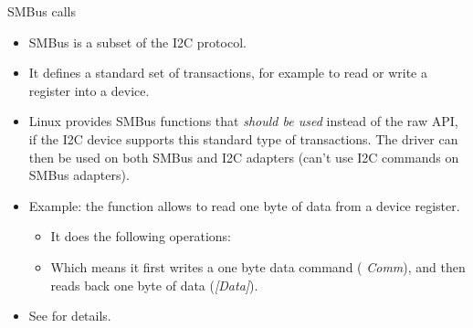 \begin{frame}{SMBus calls}
  \begin{itemize}
  \item SMBus is a subset of the I2C protocol.
  \item It defines a standard set of transactions, for example to read
    or write a register into a device.
  \item Linux provides SMBus functions that {\em should be used}
    instead of the raw API, if the I2C device supports this
    standard type of transactions. The driver can then be used on both
    SMBus and I2C adapters (can't use I2C commands on SMBus adapters).
  \item Example: the  function allows
    to read one byte of data from a device register.
    \begin{itemize}
    \item It does the following operations:
    \item Which means it first writes a one byte data command ({\em
        Comm}), and then reads back one byte of data ({\em [Data]}).
    \end{itemize}
  \item See  for details.
  \end{itemize}
\end{frame}

